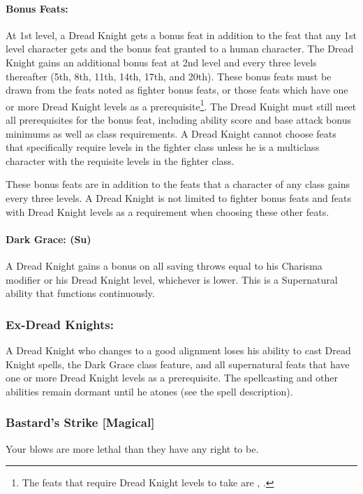 \paragraph{Bonus Feats:}
At 1st level, a Dread Knight gets a bonus feat in addition to the feat that any 1st level character gets and the bonus feat granted to a human character.
The Dread Knight gains an additional bonus feat at 2nd level and every three levels thereafter (5th, 8th, 11th, 14th, 17th, and 20th). 
These bonus feats must be drawn from the feats noted as fighter bonus feats, or those feats which have one or more Dread Knight levels as a prerequisite\footnote{
The feats that require Dread Knight levels to take are , .}. 
The Dread Knight must still meet all prerequisites for the bonus feat, 
including ability score and base attack bonus minimums as well as class requirements. 
A Dread Knight cannot choose feats that specifically require levels in the fighter class 
unless he is a multiclass character with the requisite levels in the fighter class.

These bonus feats are in addition to the feats that a character of any class gains every three levels. 
A Dread Knight is not limited to fighter bonus feats and feats with Dread Knight levels as a requirement when choosing these other feats.

\paragraph{Dark Grace: (Su)} 
A Dread Knight gains a bonus on all saving throws equal to his Charisma modifier or his Dread Knight level, whichever is lower.
This is a Supernatural ability that functions continuously.
\subsubsection{Ex-Dread Knights:}
A Dread Knight who changes to a good alignment loses his ability to cast Dread Knight spells, 
the Dark Grace class feature, 
and all supernatural feats that have one or more Dread Knight levels as a prerequisite.
The spellcasting and other abilities remain dormant until he atones (see the  spell description).

\subsubsection[Bastard's Strike]{Bastard's Strike [Magical]}
Your blows are more lethal than they have any right to be.
\label{Feat:BastardsStrike}

